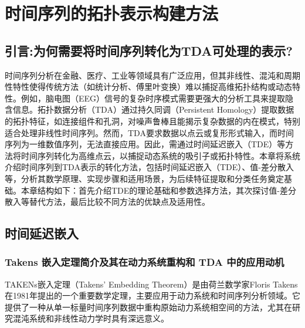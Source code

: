 \section{时间序列的拓扑表示构建方法}
\subsection{引言:为何需要将时间序列转化为TDA可处理的表示?}
时间序列分析在金融、医疗、工业等领域具有广泛应用，但其非线性、混沌和周期性特性使得传统方法（如统计分析、傅里叶变换）难以捕捉高维拓扑结构或动态特性。例如，脑电图（EEG）信号的复杂时序模式需要更强大的分析工具来提取隐含信息。拓扑数据分析（TDA）通过持久同调（Persistent Homology）提取数据的拓扑特征，如连接组件和孔洞，对噪声鲁棒且能揭示复杂数据的内在模式，特别适合处理非线性时间序列。然而，TDA要求数据以点云或复形形式输入，而时间序列为一维数值序列，无法直接应用。因此，需通过时间延迟嵌入（TDE）等方法将时间序列转化为高维点云，以捕捉动态系统的吸引子或拓扑特性。本章将系统介绍时间序列到TDA表示的转化方法，包括时间延迟嵌入（TDE）、值-差分散入等，分析其数学原理、实现步骤和适用场景，为后续特征提取和分类任务奠定基础。本章结构如下：首先介绍TDE的理论基础和参数选择方法，其次探讨值-差分散入等替代方法，最后比较不同方法的优缺点及适用性。
\subsection{时间延迟嵌入}
\subsubsection{Takens 嵌入定理简介及其在动力系统重构和 TDA 中的应用动机}
TAKENs嵌入定理（Takens' Embedding Theorem）是由荷兰数学家Floris Takens在1981年提出的一个重要数学定理，主要应用于动力系统和时间序列分析领域。它提供了一种从单一标量时间序列数据中重构原始动力系统相空间的方法，尤其在研究混沌系统和非线性动力学时具有深远意义。

